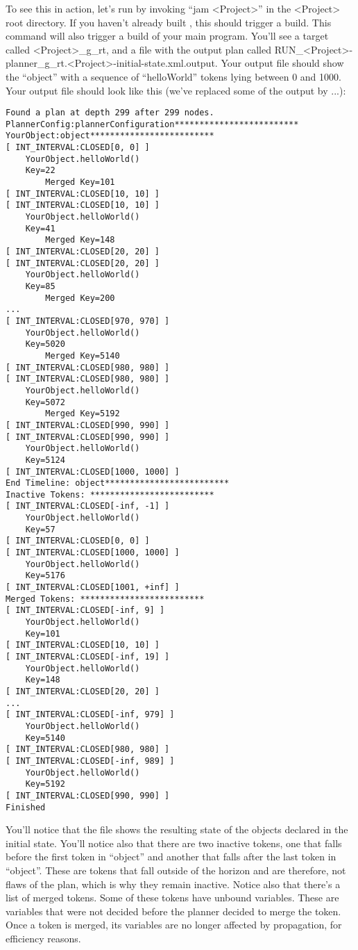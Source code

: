 \documentclass[10pt, letterpaper, twoside]{article}
\begin{document}
To see this in action, let's run by invoking ``jam <Project>'' in
the <Project> root directory.  If you haven't already built \ET, this
should trigger a build.  This command will also trigger a build of your
main program. You'll see a target called <Project>\_g\_rt, and a file with
the output plan called
RUN\_<Project>-planner\_g\_rt.<Project>-initial-state.xml.output.
Your output file should show the ``object'' with a sequence of
``helloWorld'' tokens lying between 0 and 1000. Your output file
should look like this (we've replaced some of the output by ...): 

\begin{verbatim}
Found a plan at depth 299 after 299 nodes.
PlannerConfig:plannerConfiguration*************************
YourObject:object*************************
[ INT_INTERVAL:CLOSED[0, 0] ]
	YourObject.helloWorld()
	Key=22
		Merged Key=101
[ INT_INTERVAL:CLOSED[10, 10] ]
[ INT_INTERVAL:CLOSED[10, 10] ]
	YourObject.helloWorld()
	Key=41
		Merged Key=148
[ INT_INTERVAL:CLOSED[20, 20] ]
[ INT_INTERVAL:CLOSED[20, 20] ]
	YourObject.helloWorld()
	Key=85
		Merged Key=200
...
[ INT_INTERVAL:CLOSED[970, 970] ]
	YourObject.helloWorld()
	Key=5020
		Merged Key=5140
[ INT_INTERVAL:CLOSED[980, 980] ]
[ INT_INTERVAL:CLOSED[980, 980] ]
	YourObject.helloWorld()
	Key=5072
		Merged Key=5192
[ INT_INTERVAL:CLOSED[990, 990] ]
[ INT_INTERVAL:CLOSED[990, 990] ]
	YourObject.helloWorld()
	Key=5124
[ INT_INTERVAL:CLOSED[1000, 1000] ]
End Timeline: object*************************
Inactive Tokens: *************************
[ INT_INTERVAL:CLOSED[-inf, -1] ]
	YourObject.helloWorld()
	Key=57
[ INT_INTERVAL:CLOSED[0, 0] ]
[ INT_INTERVAL:CLOSED[1000, 1000] ]
	YourObject.helloWorld()
	Key=5176
[ INT_INTERVAL:CLOSED[1001, +inf] ]
Merged Tokens: *************************
[ INT_INTERVAL:CLOSED[-inf, 9] ]
	YourObject.helloWorld()
	Key=101
[ INT_INTERVAL:CLOSED[10, 10] ]
[ INT_INTERVAL:CLOSED[-inf, 19] ]
	YourObject.helloWorld()
	Key=148
[ INT_INTERVAL:CLOSED[20, 20] ]
...
[ INT_INTERVAL:CLOSED[-inf, 979] ]
	YourObject.helloWorld()
	Key=5140
[ INT_INTERVAL:CLOSED[980, 980] ]
[ INT_INTERVAL:CLOSED[-inf, 989] ]
	YourObject.helloWorld()
	Key=5192
[ INT_INTERVAL:CLOSED[990, 990] ]
Finished
\end{verbatim}

You'll notice that the file shows the resulting state of the objects
declared in the initial state.  You'll notice also that there are two
inactive tokens, one that falls before the first token in ``object'' and
another that falls after the last token in ``object''.  These are tokens
that fall outside of the horizon and are therefore, not flaws of the plan,
which is why they remain inactive.  Notice also that there's a list of
merged tokens.  Some of these tokens have unbound variables.  These are
variables that were not decided before the planner decided to merge the
token.  Once a token is merged, its variables are no longer affected by
propagation, for efficiency reasons.
\end{document}
